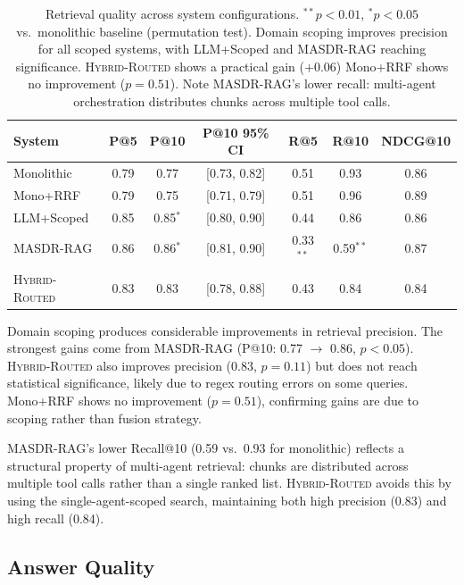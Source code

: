 \documentclass{article}
\newcommand{\systemname}{\textsc{MASDR-RAG}}
\newcommand{\hybridname}{\textsc{Hybrid-Routed}}
\newcommand{\sig}{$^{**}$}
\newcommand{\sigsingle}{$^{*}$}
\begin{document}
\begin{table}[H]
\centering
\small
\begin{tabular}{lcccccc}
\toprule
\textbf{System} & \textbf{P@5} & \textbf{P@10} & \textbf{P@10 95\% CI} & \textbf{R@5} & \textbf{R@10} & \textbf{NDCG@10} \\
\midrule
Monolithic & 0.79 & 0.77 & [0.73, 0.82] & 0.51 & 0.93 & 0.86 \\
Mono+RRF & 0.79 & 0.75 & [0.71, 0.79] & 0.51 & 0.96 & 0.89 \\
LLM+Scoped & 0.85 & 0.85\sigsingle & [0.80, 0.90] & 0.44 & 0.86 & 0.86 \\
\systemname{} & 0.86 & 0.86\sigsingle & [0.81, 0.90] & 0.33\sig & 0.59\sig & 0.87 \\
\hybridname{} & 0.83 & 0.83 & [0.78, 0.88] & 0.43 & 0.84 & 0.84 \\
\bottomrule
\end{tabular}
\caption{Retrieval quality across system configurations. \sig{}$p < 0.01$, \sigsingle{}$p < 0.05$ vs.\ monolithic baseline (permutation test). Domain scoping improves precision for all scoped systems, with LLM+Scoped and \systemname{} reaching significance. \hybridname{} shows a practical gain ($+$0.06) 
Mono+RRF shows no improvement ($p = 0.51$). Note \systemname{}'s lower recall: multi-agent orchestration distributes chunks across multiple tool calls.}
\label{tab:retrieval}
\end{table}

Domain scoping produces considerable improvements in retrieval precision. The strongest gains come from \systemname{} (P@10: 0.77 $\rightarrow$ 0.86, $p < 0.05$). \hybridname{} also improves precision (0.83, $p = 0.11$) but does not reach statistical significance, likely due to regex routing errors on some queries. Mono+RRF shows no improvement ($p = 0.51$), confirming gains are due to scoping rather than fusion strategy.

\systemname{}'s lower Recall@10 (0.59 vs.\ 0.93 for monolithic) reflects a structural property of multi-agent retrieval: chunks are distributed across multiple tool calls rather than a single ranked list. \hybridname{} avoids this by using the single-agent-scoped search, maintaining both high precision (0.83) and high recall (0.84).

\subsection{Answer Quality}
\end{document}
